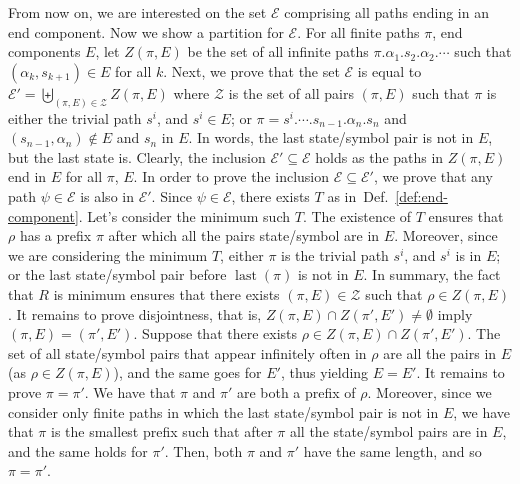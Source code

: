 \documentclass[final,3p,times,twocolumn]{elsarticle}
\theoremstyle{plain}
\theoremstyle{definition}
\newcommand{\state}{s}
\newcommand{\initstate}{\state^{i}}
\newcommand{\smbol}{\alpha}
\newcommand{\plength}{n}
\newcommand{\fpath}{\pi}
\newcommand{\ipath}{\rho}
\DeclareMathOperator{\lastWord}{last}
\newcommand{\last}[1]{\lastWord({#1})}
\newcommand{\iword}{\psi}
\newcommand{\recallDefinition}[1]{Def.~\ref{#1}}
\begin{document}
From now on, we are interested on the set $\mathcal{E}$ comprising all paths
ending in an end component. Now we show a partition for $\mathcal{E}$. For all
finite paths $\fpath$, end components $E$, let $Z(\fpath,E)$ be the set of all
infinite paths $\fpath.\smbol_{1}.\state_{2}.\smbol_{2}.\cdots$ such that
$(\smbol_{k},\state_{k+1}) \in E$ for all $k$. Next, we prove that the set
$\mathcal{E}$ is equal to
$\mathcal{E}' = \biguplus_{(\fpath,E) \in \mathcal{Z}} Z(\fpath,E)$
where $\mathcal{Z}$ is the set of all pairs $(\fpath,E)$ such that
$\fpath$ is either the trivial path $\initstate$, and $\initstate \in E$; or
$\fpath = \initstate.\cdots
			.\state_{\plength-1}.\smbol_{\plength}.\state_{\plength}$
and $(\state_{\plength-1},\smbol_{\plength}) \not\in E$ and $\state_{\plength}$
in $E$. In words, the last state/symbol pair is not in $E$, but the last state
is. Clearly, the inclusion $\mathcal{E}' \subseteq \mathcal{E}$ holds as the
paths in $Z(\fpath,E)$ end in $E$ for all $\fpath$, $E$. In order to prove the
inclusion $\mathcal{E} \subseteq \mathcal{E}'$, we prove that any path
$\iword \in \mathcal{E}$ is also in $\mathcal{E}'$. Since
$\iword \in \mathcal{E}$, there exists $T$ as
in~\recallDefinition{def:end-component}. Let's consider the minimum such $T$.
The existence of $T$ ensures that $\ipath$ has a prefix $\fpath$ after which
all the pairs state/symbol are in $E$. Moreover, since we are considering the
minimum $T$, either $\fpath$ is the trivial path $\initstate$, and $\initstate$
is in $E$; or the last state/symbol pair before $\last{\fpath}$ is not in $E$.
In summary, the fact that $R$ is minimum ensures that there exists
$(\fpath,E) \in \mathcal{Z}$ such that $\ipath \in Z(\fpath,E)$. It remains to
prove disjointness, that is, $Z(\fpath,E) \cap Z(\fpath',E') \not= \emptyset$
imply $(\fpath,E) = (\fpath',E')$. Suppose that there exists
$\ipath \in Z(\fpath,E) \cap Z(\fpath',E')$. The set of all state/symbol pairs
that appear infinitely often in $\ipath$ are all the pairs in $E$
(as $\ipath \in Z(\fpath,E)$), and the same goes for $E'$, thus yielding
$E = E'$. It remains to prove $\fpath = \fpath'$. We have that $\fpath$ and
$\fpath'$ are both a prefix of $\ipath$. Moreover, since we consider only
finite paths in which the last state/symbol pair is not in $E$, we have that
$\fpath$ is the smallest prefix such that after $\fpath$ all the state/symbol
pairs are in $E$, and the same holds for $\fpath'$. Then, both $\fpath$ and
$\fpath'$ have the same length, and so $\fpath = \fpath'$.
\end{document}

